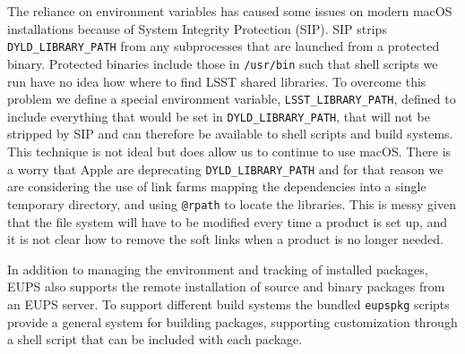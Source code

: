 The reliance on environment variables has caused some issues on modern macOS installations because of System Integrity Protection (SIP).\cite{DMTN-001}
SIP strips \texttt{DYLD\_LIBRARY\_PATH} from any subprocesses that are launched from a protected binary.
Protected binaries include those in \texttt{/usr/bin} such that shell scripts we run have no idea how where to find LSST shared libraries.
To overcome this problem we define a special environment variable, \texttt{LSST\_LIBRARY\_PATH}, defined to include everything that would be set in \texttt{DYLD\_LIBRARY\_PATH}, that will not be stripped by SIP and can therefore be available to shell scripts and build systems.
This technique is not ideal but does allow us to continue to use macOS.
There is a worry that Apple are deprecating \texttt{DYLD\_LIBRARY\_PATH} and for that reason we are considering the use of link farms mapping the dependencies into a single temporary directory, and using \texttt{@rpath} to locate the libraries.
This is messy given that the file system will have to be modified every time a product is set up, and it is not clear how to remove the soft links when a product is no longer needed.

In addition to managing the environment and tracking of installed packages, EUPS also supports the remote installation of source and binary packages from an EUPS server.
To support different build systems the bundled \texttt{eupspkg} scripts provide a general system for building packages, supporting customization through a shell script that can be included with each package.
